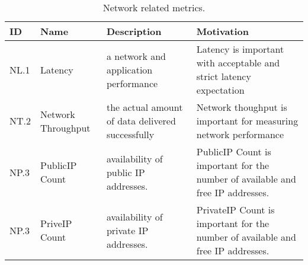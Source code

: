 \begin{table*}[P]
\caption{Network related metrics.}
\begin{scriptsize}
\label{T:metrics}
\bigskip
\begin{center}
\begin{tabular}{lp{}p{}p{}}
\hline
\rowcolor{blue!20} ID & Name & Description & Motivation \\
\hline
NL.1 &
Latency &
a network and application performance &
Latency is important with acceptable and strict latency expectation \\
\hline
NT.2 &
Network Throughput&
the actual amount of data delivered successfully &
Network thoughput is important for measuring network performance \\
\hline
NP.3 &
PublicIP Count &
availability of public IP addresses. &
PublicIP Count is important for the number of available and free IP addresses. \\
\hline
NP.3 &
PriveIP Count &
availability of private IP addresses. &
PrivateIP Count is important for the number of available and free IP addresses. \\
\hline
\end{tabular}
\end{center}
\end{scriptsize}
\end{table*}

